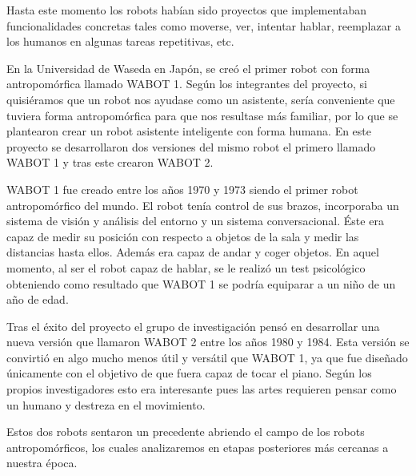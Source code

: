 Hasta este momento los robots habían sido proyectos que implementaban funcionalidades concretas tales como moverse, ver, intentar hablar, reemplazar a los humanos en algunas tareas repetitivas, etc.

\vspace{10px}

En la Universidad de Waseda en Japón, se creó el primer robot con forma antropomórfica llamado WABOT 1. Según los integrantes del proyecto, si quisiéramos que un robot nos ayudase como un asistente, sería conveniente que tuviera forma antropomórfica para que nos resultase más familiar, por lo que se plantearon crear un robot asistente inteligente con forma humana. En este proyecto se desarrollaron dos versiones del mismo robot el primero llamado WABOT 1 y tras este crearon WABOT 2.

\vspace{10px}

WABOT 1 fue creado entre los años 1970 y 1973 siendo el primer robot antropomórfico del mundo. El robot tenía control de sus brazos, incorporaba un sistema de visión y análisis del entorno y un sistema conversacional. Éste era capaz de medir su posición con respecto a objetos de la sala y medir las distancias hasta ellos. Además era capaz de andar y coger objetos. En aquel momento, al ser el robot capaz de hablar, se le realizó un test psicológico obteniendo como resultado que WABOT 1 se podría equiparar a un niño de un año de edad.

\vspace{10px}

Tras el éxito del proyecto el grupo de investigación pensó en desarrollar una nueva versión que llamaron WABOT 2 entre los años 1980 y 1984. Esta versión se convirtió en algo mucho menos útil y versátil que WABOT 1, ya que fue diseñado únicamente con el objetivo de que fuera capaz de tocar el piano. Según los propios investigadores esto era interesante pues las artes requieren pensar como un humano y destreza en el movimiento.

\vspace{10px}

Estos dos robots sentaron un precedente abriendo el campo de los robots antropomórficos, los cuales analizaremos en etapas posteriores más cercanas a nuestra época.
